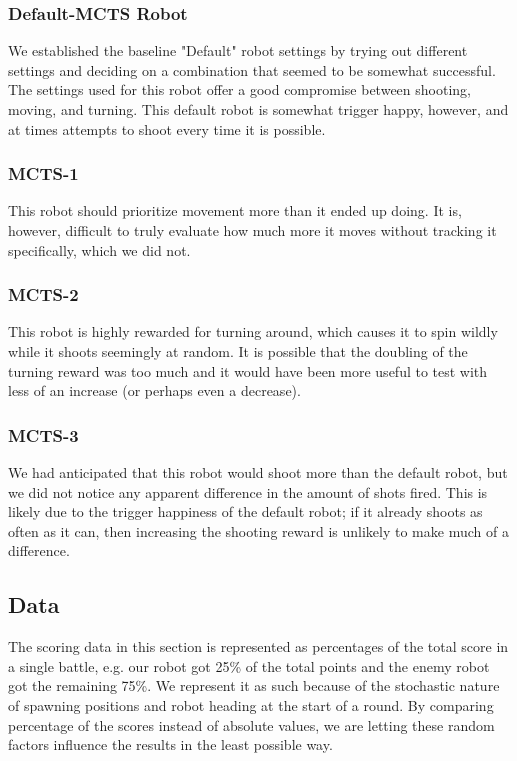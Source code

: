 \subsubsection{Default-MCTS Robot}
We established the baseline "Default" robot settings by trying out different settings and deciding on a combination that seemed to be somewhat successful. The settings used for this robot offer a good compromise between shooting, moving, and turning. This default robot is somewhat trigger happy, however, and at times attempts to shoot every time it is possible.

\subsubsection{MCTS-1}
This robot should prioritize movement more than it ended up doing. It is, however, difficult to truly evaluate how much more it moves without tracking it specifically, which we did not. 

\subsubsection{MCTS-2} 
This robot is highly rewarded for turning around, which causes it to spin wildly while it shoots seemingly at random. It is possible that the doubling of the turning reward was too much and it would have been more useful to test with less of an increase (or perhaps even a decrease).

\subsubsection{MCTS-3}
We had anticipated that this robot would shoot more than the default robot, but we did not notice any apparent difference in the amount of shots fired. This is likely due to the trigger happiness of the default robot; if it already shoots as often as it can, then increasing the shooting reward is unlikely to make much of a difference.

\subsection{Data}
The scoring data in this section is represented as percentages of the total score in a single battle, e.g. our robot got 25\% of the total points and the enemy robot got the remaining 75\%. We represent it as such because of the stochastic nature of spawning positions and robot heading at the start of a round. By comparing percentage of the scores instead of absolute values, we are letting these random factors influence the results in the least possible way.


